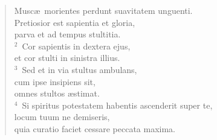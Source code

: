 \begin{flushleft}\begin{verse}\vspace{-19pt}\hspace{6pt}Musc\ae\ morientes perdunt suavitatem unguenti.\\\hspace{6pt} Pretiosior est sapientia et gloria,\\ parva et ad tempus stultitia.\\
${}^{2}$~Cor sapientis in dextera ejus,\\ et cor stulti in sinistra illius.\\
${}^{3}$~Sed et in via stultus ambulans,\\ cum ipse insipiens sit,\\ omnes stultos \ae stimat.\\
${}^{4}$~Si spiritus potestatem habentis ascenderit super te,\\ locum tuum ne demiseris,\\ quia curatio faciet cessare peccata maxima.\end{verse}\end{flushleft}


